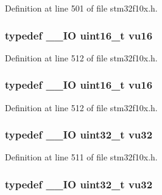 Definition at line 501 of file stm32f10x.\+h.

\subsubsection[{\texorpdfstring{vu16}{vu16}}]{\setlength{\rightskip}{0pt plus 5cm}typedef {\bf \+\_\+\+\_\+\+IO} {\bf uint16\+\_\+t} {\bf vu16}}\hypertarget{group___exported__types_ga93d1a6b3dcfdded10a7b15548679fe0a}{}\label{group___exported__types_ga93d1a6b3dcfdded10a7b15548679fe0a}


Definition at line 512 of file stm32f10x.\+h.

\subsubsection[{\texorpdfstring{vu16}{vu16}}]{\setlength{\rightskip}{0pt plus 5cm}typedef {\bf \+\_\+\+\_\+\+IO} {\bf uint16\+\_\+t} {\bf vu16}}\hypertarget{group___exported__types_ga93d1a6b3dcfdded10a7b15548679fe0a}{}\label{group___exported__types_ga93d1a6b3dcfdded10a7b15548679fe0a}


Definition at line 512 of file stm32f10x.\+h.

\subsubsection[{\texorpdfstring{vu32}{vu32}}]{\setlength{\rightskip}{0pt plus 5cm}typedef {\bf \+\_\+\+\_\+\+IO} {\bf uint32\+\_\+t} {\bf vu32}}\hypertarget{group___exported__types_ga0cd21c4793673b69ecd5fd673353a145}{}\label{group___exported__types_ga0cd21c4793673b69ecd5fd673353a145}


Definition at line 511 of file stm32f10x.\+h.

\subsubsection[{\texorpdfstring{vu32}{vu32}}]{\setlength{\rightskip}{0pt plus 5cm}typedef {\bf \+\_\+\+\_\+\+IO} {\bf uint32\+\_\+t} {\bf vu32}}\hypertarget{group___exported__types_ga0cd21c4793673b69ecd5fd673353a145}{}\label{group___exported__types_ga0cd21c4793673b69ecd5fd673353a145}


